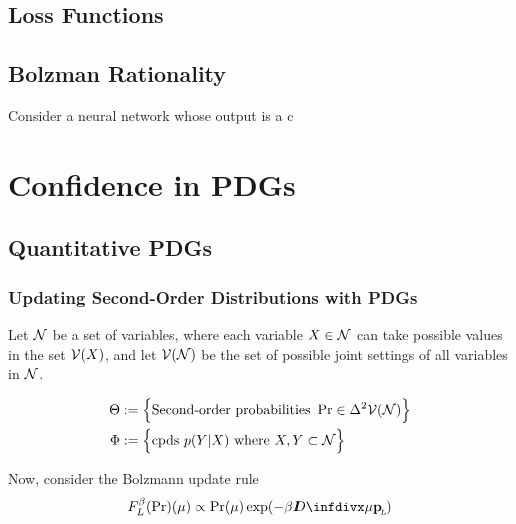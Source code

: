 \documentclass{article}
\begin{document}
\subsection{Loss Functions}
\subsection{Bolzman Rationality}

\begin{examplex}{}{}
    Consider a neural network whose output is a c
\end{examplex}

\section{Confidence in PDGs}
\subsection{Quantitative PDGs}

\subsubsection{Updating Second-Order Distributions with PDGs}
Let $\mathcal N$ be a set of variables, where each variable $X \in \mathcal N$ can take possible values in the set $\mathcal V(X)$, and let $\mathcal V(\mathcal N)$ be the set of possible joint settings of all variables in $\mathcal N$.

\begin{align*}
    \Theta &:=
        \Big\{
        \text{Second-order probabilities}~ \Pr \in \Delta^2 \mathcal V(\mathcal N)
        \Big\} \\
    \Phi &:= \Big\{ \text{cpds}~ p(Y|X)
        \text{ where }  X, Y \subset \mathcal N \Big\}
\end{align*}

Now, consider the Bolzmann update rule
\[
    F_L^{\beta}(\Pr) (\mu) \propto \Pr(\mu) \exp(-\beta \kldiv\mu \bp)
\]
\end{document}
